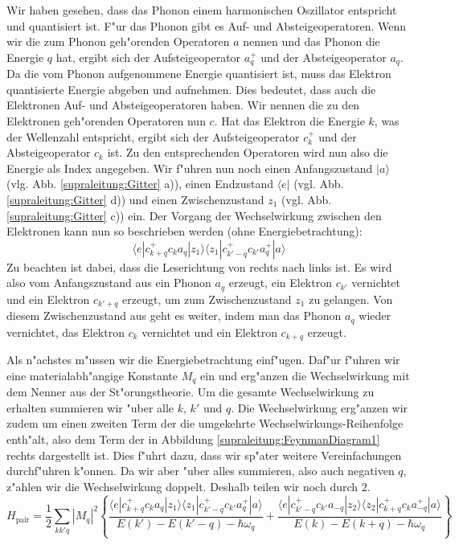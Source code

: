 \begin{refsection}
Wir haben gesehen, dass das Phonon einem harmonischen Oszillator entspricht und quantisiert ist.
F"ur das Phonon gibt es  Auf- und Absteigeoperatoren.
Wenn wir die zum Phonon geh"orenden Operatoren $a$ nennen und das Phonon die Energie $q$ hat,
ergibt sich der Aufsteigeoperator
$a^+_q$ und der Absteigeoperator $a_q$.
Da die vom Phonon aufgenommene Energie quantisiert ist, muss das Elektron quantisierte Energie
abgeben und aufnehmen.
Dies bedeutet, dass auch die Elektronen Auf- und Absteigeoperatoren haben.
Wir nennen die zu den Elektronen geh"orenden Operatoren nun $c$. Hat das Elektron die Energie $k$,
was der Wellenzahl entspricht, ergibt sich der Aufsteigeoperator $c^+_k$ und der
Absteigeoperator $c_k$ ist.
Zu den entsprechenden Operatoren wird nun also die Energie als Index angegeben.
Wir f"uhren nun noch einen Anfangszustand $|a\rangle$ (vlg. Abb. \ref{supraleitung:Gitter} a)),
einen Endzustand $\langle e|$ (vgl. Abb. \ref{supraleitung:Gitter} d)) und
einen Zwischenzustand $z_1$ (vgl. Abb. \ref{supraleitung:Gitter} c)) ein.
Der Vorgang der Wechselwirkung zwischen den Elektronen kann nun so beschrieben werden
(ohne Energiebetrachtung):
\begin{equation}
\langle e|c^+_{k+q} c_k a_q |z_1\rangle\langle z_1| c^+_{k'-q} c_{k'} a^+_q |a\rangle
\label{supraleitung:WechselwirkungOE}
\end{equation}
Zu beachten ist dabei, dass die Leserichtung von rechts nach links ist.
Es wird also vom Anfangszustand aus ein Phonon $a_q$ erzeugt, ein Elektron $c_{k'}$ vernichtet
und ein Elektron $c_{k'+q}$ erzeugt, um zum Zwischenzustand $z_1$ zu gelangen.
Von diesem Zwischenzustand aus geht es weiter, indem man das Phonon $a_q$ wieder vernichtet,
das Elektron $c_k$ vernichtet und ein Elektron $c_{k+q}$ erzeugt.

Als n"achstes m"ussen wir die Energiebetrachtung einf"ugen.
Daf"ur f"uhren wir eine materialabh"angige Konstante $M_q$ ein und erg"anzen die
Wechselwirkung mit dem Nenner aus der St"orungstheorie.
Um die gesamte Wechselwirkung zu erhalten summieren wir "uber alle $k$, $k'$ und $q$.
Die Wechselwirkung erg"anzen wir zudem um einen zweiten Term der die umgekehrte
Wechselwirkungs-Reihenfolge enth"alt, also dem Term der in Abbildung \ref{supraleitung:FeynmanDiagram1} rechts dargestellt ist.
Dies f"uhrt dazu, dass wir sp"ater weitere Vereinfachungen durchf"uhren k"onnen.
Da wir aber "uber alles summieren, also auch negativen $q$, z"ahlen wir die Wechselwirkung
doppelt. Deshalb teilen wir noch durch $2$.
\begin{equation}
H_{\text{pair}}=
\frac{1}{2}
\sum \limits_{kk'q} |M_q|^2
\left\{
\frac
{\langle e|c^+_{k+q} c_k a_q |z_1\rangle\langle z_1| c^+_{k'-q} c_{k'} a^+_q |a\rangle }
{E(k')-E(k'-q)-\hbar\omega_q}
+
\frac
{\langle e|c^+_{k'-q} c_{k'} a_{-q}|z_2\rangle\langle z_2| c^+_{k+q} c_k a^+_{-q} |a\rangle }
{E(k)-E(k+q)-\hbar\omega_q}
\right\}
\label{supraleitung:WechselwirkungME}
\end{equation}


\end{refsection}
